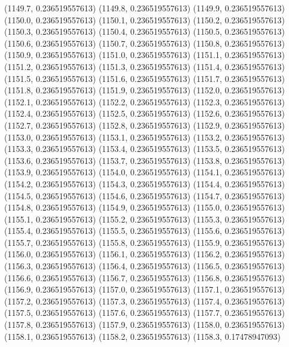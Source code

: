 {					(1149.7, 0.236519557613)
					(1149.8, 0.236519557613)
					(1149.9, 0.236519557613)
					(1150.0, 0.236519557613)
					(1150.1, 0.236519557613)
					(1150.2, 0.236519557613)
					(1150.3, 0.236519557613)
					(1150.4, 0.236519557613)
					(1150.5, 0.236519557613)
					(1150.6, 0.236519557613)
					(1150.7, 0.236519557613)
					(1150.8, 0.236519557613)
					(1150.9, 0.236519557613)
					(1151.0, 0.236519557613)
					(1151.1, 0.236519557613)
					(1151.2, 0.236519557613)
					(1151.3, 0.236519557613)
					(1151.4, 0.236519557613)
					(1151.5, 0.236519557613)
					(1151.6, 0.236519557613)
					(1151.7, 0.236519557613)
					(1151.8, 0.236519557613)
					(1151.9, 0.236519557613)
					(1152.0, 0.236519557613)
					(1152.1, 0.236519557613)
					(1152.2, 0.236519557613)
					(1152.3, 0.236519557613)
					(1152.4, 0.236519557613)
					(1152.5, 0.236519557613)
					(1152.6, 0.236519557613)
					(1152.7, 0.236519557613)
					(1152.8, 0.236519557613)
					(1152.9, 0.236519557613)
					(1153.0, 0.236519557613)
					(1153.1, 0.236519557613)
					(1153.2, 0.236519557613)
					(1153.3, 0.236519557613)
					(1153.4, 0.236519557613)
					(1153.5, 0.236519557613)
					(1153.6, 0.236519557613)
					(1153.7, 0.236519557613)
					(1153.8, 0.236519557613)
					(1153.9, 0.236519557613)
					(1154.0, 0.236519557613)
					(1154.1, 0.236519557613)
					(1154.2, 0.236519557613)
					(1154.3, 0.236519557613)
					(1154.4, 0.236519557613)
					(1154.5, 0.236519557613)
					(1154.6, 0.236519557613)
					(1154.7, 0.236519557613)
					(1154.8, 0.236519557613)
					(1154.9, 0.236519557613)
					(1155.0, 0.236519557613)
					(1155.1, 0.236519557613)
					(1155.2, 0.236519557613)
					(1155.3, 0.236519557613)
					(1155.4, 0.236519557613)
					(1155.5, 0.236519557613)
					(1155.6, 0.236519557613)
					(1155.7, 0.236519557613)
					(1155.8, 0.236519557613)
					(1155.9, 0.236519557613)
					(1156.0, 0.236519557613)
					(1156.1, 0.236519557613)
					(1156.2, 0.236519557613)
					(1156.3, 0.236519557613)
					(1156.4, 0.236519557613)
					(1156.5, 0.236519557613)
					(1156.6, 0.236519557613)
					(1156.7, 0.236519557613)
					(1156.8, 0.236519557613)
					(1156.9, 0.236519557613)
					(1157.0, 0.236519557613)
					(1157.1, 0.236519557613)
					(1157.2, 0.236519557613)
					(1157.3, 0.236519557613)
					(1157.4, 0.236519557613)
					(1157.5, 0.236519557613)
					(1157.6, 0.236519557613)
					(1157.7, 0.236519557613)
					(1157.8, 0.236519557613)
					(1157.9, 0.236519557613)
					(1158.0, 0.236519557613)
					(1158.1, 0.236519557613)
					(1158.2, 0.236519557613)
					(1158.3, 0.17478947093)
}
